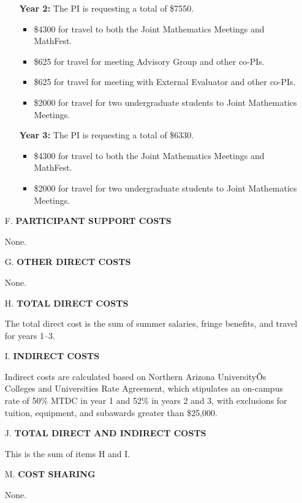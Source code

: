 \documentclass[11pt]{article}
\begin{document}
\begin{enumerate}[leftmargin=*]
\begin{enumerate}
\item[] \textbf{Year 2:} The PI is requesting a total of \$7550.
\begin{itemize}
\item \$4300 for travel to both the Joint Mathematics Meetings and MathFest.
\item \$625 for travel for meeting Advisory Group and other co-PIs.
\item \$625 for travel for meeting with External Evaluator and other co-PIs.
\item \$2000 for travel for two undergraduate students to Joint Mathematics Meetings.
\end{itemize}

\item[] \textbf{Year 3:} The PI is requesting a total of \$6330.
\begin{itemize}
\item \$4300 for travel to both the Joint Mathematics Meetings and MathFest.
\item \$2000 for travel for two undergraduate students to Joint Mathematics Meetings.
\end{itemize} 
\end{enumerate}

\hfill {}

\item[F.] \textbf{PARTICIPANT SUPPORT COSTS}

None. \hfill {}

\item[G.] \textbf{OTHER DIRECT COSTS}

None. \hfill {}

\item[H.] \textbf{TOTAL DIRECT COSTS}

The total direct cost is the sum of summer salaries, fringe benefits, and travel for years 1--3. 

\hfill {}

\item[I.] \textbf{INDIRECT COSTS}

Indirect costs are calculated based on Northern Arizona UniversityÕs Colleges and Universities Rate Agreement, which stipulates an on-campus rate of 50\% MTDC in year 1 and 52\% in years 2 and 3, with exclusions for tuition, equipment, and subawards greater than \$25,000. \hfill {}

\item[J.] \textbf{TOTAL DIRECT AND INDIRECT COSTS}

This is the sum of items H and I. \hfill {}

\item[M.] \textbf{COST SHARING}

None. \hfill {}

\end{enumerate}
\end{document}
